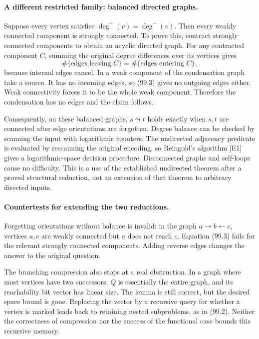 \documentclass[11pt]{article}
\begin{document}
\paragraph{A different restricted family: balanced directed graphs.}
Suppose every vertex satisfies $\deg^+(v)=\deg^-(v)$. Then every weakly connected component is strongly connected. To prove this, contract strongly connected components to obtain an acyclic directed graph. For any contracted component $C$, summing the original degree differences over its vertices gives
\[
 \#\{\text{edges leaving }C\}
 =\#\{\text{edges entering }C\},
 \tag{99.3}
\]
because internal edges cancel. In a weak component of the condensation graph take a source. It has no incoming edges, so (99.3) gives no outgoing edges either. Weak connectivity forces it to be the whole weak component. Therefore the condensation has no edges and the claim follows.

Consequently, on these balanced graphs, $s\leadsto t$ holds exactly when $s,t$ are connected after edge orientations are forgotten. Degree balance can be checked by scanning the input with logarithmic counters. The undirected adjacency predicate is evaluated by rescanning the original encoding, so Reingold's algorithm [E1] gives a logarithmic-space decision procedure. Disconnected graphs and self-loops cause no difficulty. This is a use of the established undirected theorem after a proved structural reduction, not an extension of that theorem to arbitrary directed inputs.

\paragraph{Countertests for extending the two reductions.}
Forgetting orientations without balance is invalid: in the graph $a\to b\leftarrow c$, vertices $a,c$ are weakly connected but $a$ does not reach $c$. Equation (99.3) fails for the relevant strongly connected components. Adding reverse edges changes the answer to the original question.

The branching compression also stops at a real obstruction. In a graph where most vertices have two successors, $Q$ is essentially the entire graph, and its reachability bit vector has linear size. The lemma is still correct, but the desired space bound is gone. Replacing the vector by a recursive query for whether a vertex is marked leads back to retaining nested subproblems, as in (99.2). Neither the correctness of compression nor the success of the functional case bounds this recursive memory.
\end{document}
